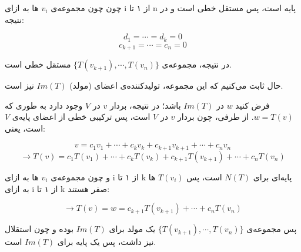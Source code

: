 چون چون مجموعه‌ی $v_i$ ها به ازای i از ۱ تا n پایه است، پس مستقل خطی است و در نتیجه:

$$ d_1 = \cdots = d_k = 0 $$
$$ c_{k+1} = \cdots = c_n = 0 $$

در نتیجه، مجموعه‌ی $\{T(v_{k+1}),\cdots,T(v_n)\}$ مستقل خطی است.

حال ثابت می‌کنیم که این مجموعه، تولیدکننده‌ی اعضای (مولد) $Im(T)$ نیز است.

فرض کنید $w$ در $Im(T)$ باشد؛ در نتیجه، بردار $v$ در $V$ وجود دارد به طوری که $w = T(v)$. از طرفی، چون بردار $v$ در $V$ است، پس ترکیبی خطی از اعضای پایه‌ی $V$ است، یعنی:

$$ v = c_1 v_1 + \cdots + c_k v_k + c_{k+1} v_{k+1} + \cdots + c_n v_n $$
$$ \to T(v) = c_1 T(v_1) + \cdots + c_k T(v_k) + c_{k+1} T(v_{k+1}) + \cdots + c_n T(v_n) $$

و چون مجموعه‌ی $v_i$ ها به ازای i از ۱ تا k پایه‌ای برای $N(T)$ است، پس $T(v_i)$ ها به ازای i از ۱ تا k صفر هستند:

$$ \to T(v) = w = c_{k+1} T(v_{k+1}) + \cdots + c_n T(v_n) $$

پس مجموعه‌ی $\{T(v_{k+1}),\cdots,T(v_n)\}$ یک مولد برای $Im(T)$ بوده و چون استقلال نیز داشت، پس یک پایه برای $Im(T)$ است.





